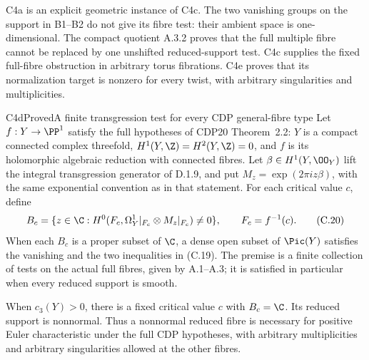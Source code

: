 C4a is an explicit geometric instance of C4c. The two vanishing groups on the support in B1--B2 do not give its fibre test: their ambient space is one-dimensional. The compact quotient A.3.2 proves that the full multiple fibre cannot be replaced by one unshifted reduced-support test. C4c supplies the fixed full-fibre obstruction in arbitrary torus fibrations. C4e proves that its normalization target is nonzero for every twist, with arbitrary singularities and multiplicities.

\begin{statement}{C4d}{Proved}{A finite transgression test for every CDP general-fibre type}
Let $f:Y\to\PP^1$ satisfy the full hypotheses of CDP20 Theorem~2.2: $Y$ is a compact connected complex threefold, $H^1(Y,\Z)=H^2(Y,\Z)=0$, and $f$ is its holomorphic algebraic reduction with connected fibres. Let $\beta\in H^1(Y,\OO_Y)$ lift the integral transgression generator of D.1.9, and put $M_z=\exp(2\pi i z\beta)$, with the same exponential convention as in that statement. For each critical value $c$, define
\[
 B_c=\{z\in\C:
 H^0(F_c,\Omega_Y^1|_{F_c}\otimes M_z|_{F_c})\ne0\},
 \qquad F_c=f^{-1}(c).
 \tag{C.20}
\]
When each $B_c$ is a proper subset of $\C$, a dense open subset of $\Pic(Y)$ satisfies the vanishing and the two inequalities in (C.19). The premise is a finite collection of tests on the actual full fibres, given by A.1--A.3; it is satisfied in particular when every reduced support is smooth.

When $c_3(Y)>0$, there is a fixed critical value $c$ with $B_c=\C$. Its reduced support is nonnormal. Thus a nonnormal reduced fibre is necessary for positive Euler characteristic under the full CDP hypotheses, with arbitrary multiplicities and arbitrary singularities allowed at the other fibres.
\end{statement}
